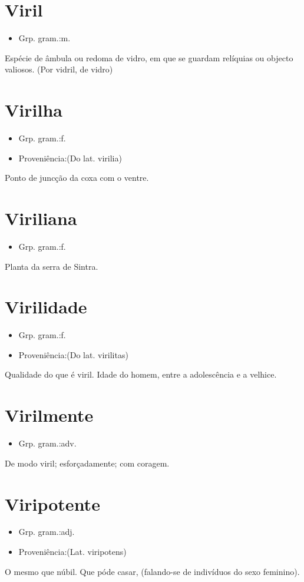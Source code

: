 \documentclass{article}
\begin{document}
\section{Viril}
\begin{itemize}
\item {Grp. gram.:m.}
\end{itemize}
Espécie de âmbula ou redoma de vidro, em que se guardam relíquias ou objecto valiosos.
(Por \textunderscore vidril\textunderscore , de \textunderscore vidro\textunderscore )
\section{Virilha}
\begin{itemize}
\item {Grp. gram.:f.}
\end{itemize}
\begin{itemize}
\item {Proveniência:(Do lat. \textunderscore virilia\textunderscore )}
\end{itemize}
Ponto de juncção da coxa com o ventre.
\section{Viriliana}
\begin{itemize}
\item {Grp. gram.:f.}
\end{itemize}
Planta da serra de Sintra.
\section{Virilidade}
\begin{itemize}
\item {Grp. gram.:f.}
\end{itemize}
\begin{itemize}
\item {Proveniência:(Do lat. \textunderscore virilitas\textunderscore )}
\end{itemize}
Qualidade do que é viril.
Idade do homem, entre a adolescência e a velhice.
\section{Virilmente}
\begin{itemize}
\item {Grp. gram.:adv.}
\end{itemize}
De modo viril; esforçadamente; com coragem.
\section{Viripotente}
\begin{itemize}
\item {Grp. gram.:adj.}
\end{itemize}
\begin{itemize}
\item {Proveniência:(Lat. \textunderscore viripotens\textunderscore )}
\end{itemize}
O mesmo que \textunderscore núbil\textunderscore .
Que póde casar, (falando-se de indivíduos do sexo feminino).
\end{document}
